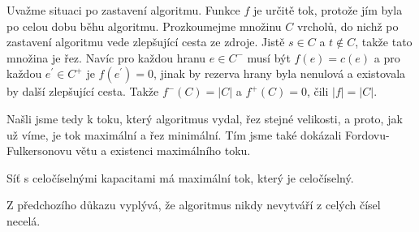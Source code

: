 \begin{t_proof}
  Uvažme situaci po zastavení algoritmu. Funkce $f$ je určitě tok, protože jím byla po celou dobu běhu algoritmu. Prozkoumejme množinu $C$ vrcholů, do nichž po zastavení algoritmu vede zlepšující cesta ze zdroje. Jistě $s\in C$ a $t\notin C$, takže tato množina je řez. Navíc pro každou hranu $e\in C^-$ musí být $f(e)=c(e)$ a pro každou $e^\prime\in C^+$ je $f(e^\prime)=0$, jinak by rezerva hrany byla nenulová a existovala by další zlepšující cesta. Takže $f^-(C)=|C|$ a $f^+(C)=0$, čili $|f|=|C|$.
  
  Našli jsme tedy k toku, který algoritmus vydal, řez stejné velikosti, a proto, jak už víme, je tok maximální a řez minimální. Tím jsme také dokázali Fordovu-Fulkersonovu větu a existenci maximálního toku.
\end{t_proof}

\begin{t_corollary}
  Síť s celočíselnými kapacitami má maximální tok, který je celočíselný.
\end{t_corollary}

\begin{t_proof}
  Z předchozího důkazu vyplývá, že algoritmus nikdy nevytváří z celých čísel necelá.
\end{t_proof}

